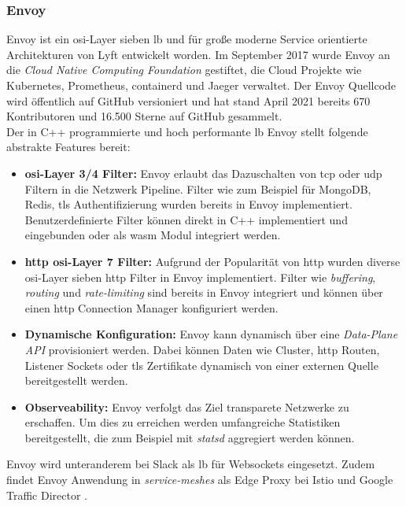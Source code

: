 \subsubsection{Envoy} \label{s:envoy}
Envoy ist ein \ac{osi}-Layer sieben \acl{lb} und für gro{\ss}e moderne Service orientierte Architekturen von Lyft entwickelt worden.
Im September 2017 wurde Envoy an die \textit{Cloud Native Computing Foundation} gestiftet, die Cloud Projekte wie Kubernetes, Prometheus, containerd und Jaeger verwaltet.
Der Envoy Quellcode wird öffentlich auf GitHub versioniert und hat stand April 2021 bereits 670 Kontributoren und 16.500 Sterne auf GitHub gesammelt. \cite{EnvoyproxyEnvoy2021}
\\
Der in C++ programmierte und hoch performante \ac{lb} Envoy stellt folgende abstrakte Features bereit:
\begin{itemize}
    \item \textbf{\acs{osi}-Layer 3/4 Filter:} Envoy erlaubt das Dazuschalten von \acs{tcp} oder \acs{udp} Filtern in die Netzwerk Pipeline. Filter wie zum Beispiel für MongoDB, Redis, \ac{tls} Authentifizierung wurden bereits in Envoy implementiert. Benutzerdefinierte Filter können direkt in C++ implementiert und eingebunden oder als \ac{wasm} Modul integriert werden.
    \item \textbf{\acs{http} \ac{osi}-Layer 7 Filter:} Aufgrund der Popularität von \ac{http} wurden diverse \ac{osi}-Layer sieben \ac{http} Filter in Envoy implementiert. Filter wie \textit{buffering}, \textit{routing} und \textit{rate-limiting} sind bereits in Envoy integriert und können über einen \ac{http} Connection Manager konfiguriert werden.
    \item \textbf{Dynamische Konfiguration:} Envoy kann dynamisch über eine \textit{Data-Plane API} provisioniert werden. Dabei können Daten wie Cluster, \ac{http} Routen, Listener Sockets oder \ac{tls} Zertifikate dynamisch von einer externen Quelle bereitgestellt werden.
    \item \textbf{Observeability:} Envoy verfolgt das Ziel transparete Netzwerke zu erschaffen. Um dies zu erreichen werden umfangreiche Statistiken bereitgestellt, die zum Beispiel mit \textit{statsd} aggregiert werden können.
\end{itemize}
\cite{WhatEnvoyEnvoy}
Envoy wird unteranderem bei Slack \cite{MigratingMillionsConcurrent2021} als \acl{lb} für Websockets eingesetzt. Zudem findet Envoy Anwendung in \textit{service-meshes} als Edge Proxy bei Istio \cite{Istio} und Google Traffic Director \cite{TrafficDirectorGoogle}.

\newpage
